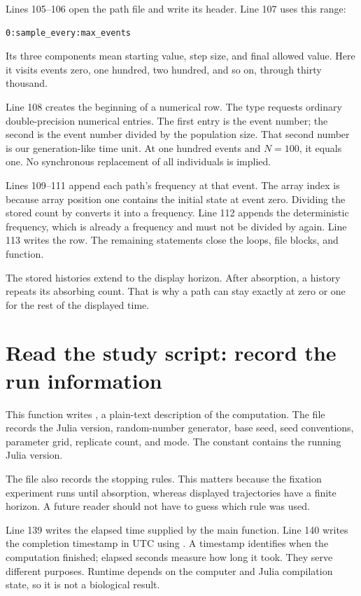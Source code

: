 Lines 105--106 open the path file and write its header. Line 107 uses this range:
\begin{lstlisting}[numbers=none]
0:sample_every:max_events
\end{lstlisting}
Its three components mean starting
value, step size, and final allowed value. Here it visits events zero, one
hundred, two hundred, and so on, through thirty thousand.

Line 108 creates the beginning of a numerical row. The type
 requests ordinary double-precision numerical entries. The
first entry is the event number; the second is the event number divided by
the population size. That second number is our generation-like time unit.
At one hundred events and \(N=100\), it equals one. No synchronous
replacement of all individuals is implied.

Lines 109--111 append each path's frequency at that event. The array index
is  because array position one contains the initial state
at event zero. Dividing the stored count by  converts it into a
frequency. Line 112 appends the deterministic frequency, which is already
a frequency and must not be divided by  again. Line 113 writes
the row. The remaining  statements close the loops, file blocks,
and function.

The stored histories extend to the display horizon. After absorption, a
history repeats its absorbing count. That is why a path can stay exactly at
zero or one for the rest of the displayed time.

\section{Read the study script: record the run information}



This function writes , a plain-text description of the
computation. The file records the Julia version, random-number generator,
base seed, seed conventions, parameter grid, replicate count, and mode.
The constant  contains the running Julia version.

The file also records the stopping rules. This matters because the fixation
experiment runs until absorption, whereas displayed trajectories have a
finite horizon. A future reader should not have to guess which rule was used.

Line 139 writes the elapsed time supplied by the main function. Line 140
writes the completion timestamp in UTC using .
A timestamp identifies when the computation finished; elapsed seconds measure
how long it took. They serve different purposes. Runtime depends on the
computer and Julia compilation state, so it is not a biological result.

